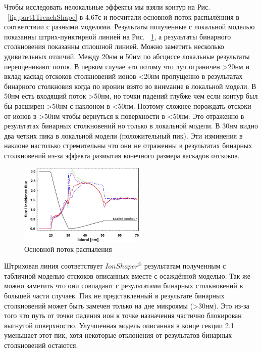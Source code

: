 \documentclass[a4paper,fontsize=12pt]{article}
\begin{document}
Чтобы исследовать нелокальные эффекты мы взяли контур на Рис. ~\ref{fig:part1TrenchShape} в 4.67с и посчитали основной поток распылённия в соответствии с разными моделями. Результаты полученные с локальной моделью показанны штрих-пунктирной линией на Рис. ~\ref{fig:part1Flux}, а результаты бинарного столкновения показанны сплошной линией. Можно заметить несколько удивительных отличий. Между 20нм и 50нм по абсциссе локальные результаты переоценивают поток. В первом случае это потому что луч ограничен \textgreater 20нм и вклад каскад отскоков столкновений ионов \textless 20нм пропущенно в результатах бинарного столкновия когда по иронии взято во внимание в локальной модели. В 50нм есть входящий поток \textgreater 50нм, но точки падений глубже чем если контур был бы расширен \textgreater 50нм с наклоном в \textless 50нм. Поэтому сложнее порождать отскоки от ионов в \textgreater 50нм чтобы вернуться к поверхности в \textless 50нм. Это отраженно в результатах бинарных столкновений но только в локальной модели. В 30нм видно два четких пика в локальной модели (положительный пик). Эти изминения в наклоне настолько стремительны что они не отраженны в результатах бинарных столкновений из-за эффекта размытия конечного размера каскадов отскоков.


\begin{figure}[h]
    \centering
    \includegraphics[width=6cm]{images/part1/4.eps}
    \caption{Основной поток распыления}
    \label{fig:part1Flux}
\end{figure}


Штриховая линия соответствует $IonShaper^{®}$ результатам полученным с табличной моделью отскоков описанных вместе с осаждённой моделью. Так же можно заметить что они совпадают с результатами бинарных столкновений в большей части случаев. Пик не представленный в результате бинарных столкновений может быть замечен только на дне микроямы (\textgreater 30нм). Это из-за того что путь от точки падения ион к точке назначения частично блокирован выгнутой поверхностю. Улучшенная модель описанная в конце секции 2.1 уменьшает этот пик, хотя некоторые отклонения от результатов бинарных столкновений остаются.
\end{document}
